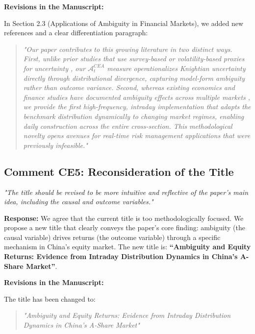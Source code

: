 \documentclass[12pt]{article}
\begin{document}
\begin{highlightbox}
\textbf{Revisions in the Manuscript:}

In Section 2.3 (Applications of Ambiguity in Financial Markets), we added new references and a clear differentiation paragraph:
\vspace{0.2cm}
\begin{quote}
\itshape "Our paper contributes to this growing literature in two distinct ways. First, unlike prior studies that use survey-based or volatility-based proxies for uncertainty \citep[e.g.][]{xu2016,kim2021}, our $\mathcal{A}^{CEA}_t$ measure operationalizes Knightian uncertainty directly through distributional divergence, capturing model-form ambiguity rather than outcome variance. Second, whereas existing economics and finance studies have documented ambiguity effects across multiple markets \citep[e.g.][]{doi:10.1093/oep/gpae004,doi:10.1007/s10479-021-04314-7}, we provide the first high-frequency, intraday implementation that adapts the benchmark distribution dynamically to changing market regimes, enabling daily construction across the entire cross-section. This methodological novelty opens avenues for real-time risk management applications that were previously infeasible."
\end{quote}
\end{highlightbox}

\subsection*{Comment CE5: Reconsideration of the Title}
\textit{"The title should be revised to be more intuitive and reflective of the paper's main idea, including the causal and outcome variables."}

\begin{highlightbox}
\textbf{Response:} We agree that the current title is too methodologically focused. We propose a new title that clearly conveys the paper's core finding: ambiguity (the causal variable) drives returns (the outcome variable) through a specific mechanism in China's equity market. The new title is: \textbf{``Ambiguity and Equity Returns: Evidence from Intraday Distribution Dynamics in China's A-Share Market''}.
\end{highlightbox}

\begin{highlightbox}
\textbf{Revisions in the Manuscript:}

The title has been changed to:
\vspace{0.2cm}
\begin{quote}
\itshape "Ambiguity and Equity Returns: Evidence from Intraday Distribution Dynamics in China's A-Share Market"
\end{quote}
\end{highlightbox}
\end{document}
